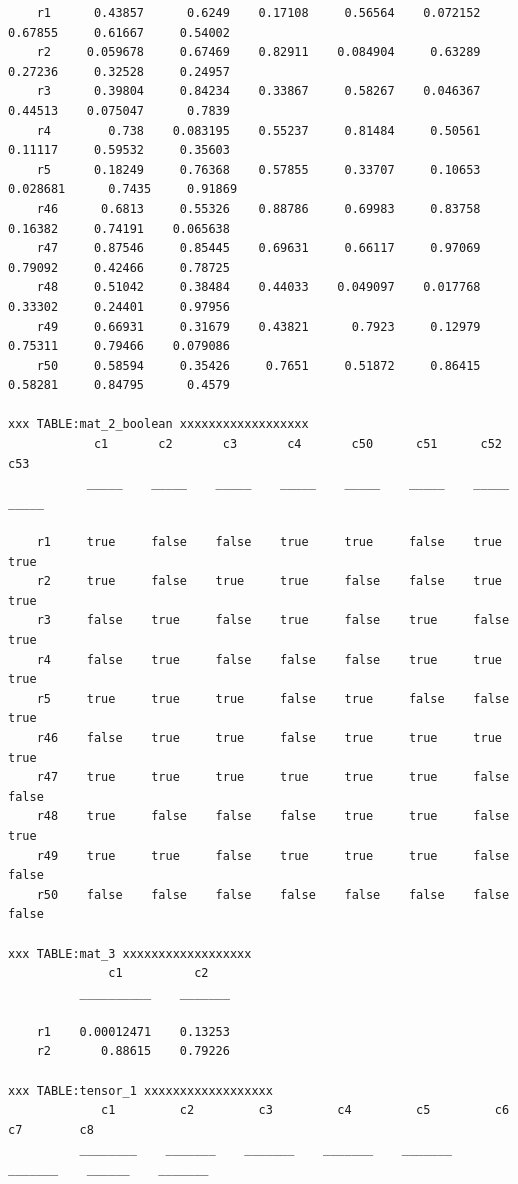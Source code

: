 \documentclass[
]{book}
\begin{document}
\begin{verbatim}
    r1      0.43857      0.6249    0.17108     0.56564    0.072152     0.67855     0.61667     0.54002
    r2     0.059678     0.67469    0.82911    0.084904     0.63289     0.27236     0.32528     0.24957
    r3      0.39804     0.84234    0.33867     0.58267    0.046367     0.44513    0.075047      0.7839
    r4        0.738    0.083195    0.55237     0.81484     0.50561     0.11117     0.59532     0.35603
    r5      0.18249     0.76368    0.57855     0.33707     0.10653    0.028681      0.7435     0.91869
    r46      0.6813     0.55326    0.88786     0.69983     0.83758     0.16382     0.74191    0.065638
    r47     0.87546     0.85445    0.69631     0.66117     0.97069     0.79092     0.42466     0.78725
    r48     0.51042     0.38484    0.44033    0.049097    0.017768     0.33302     0.24401     0.97956
    r49     0.66931     0.31679    0.43821      0.7923     0.12979     0.75311     0.79466    0.079086
    r50     0.58594     0.35426     0.7651     0.51872     0.86415     0.58281     0.84795      0.4579

xxx TABLE:mat_2_boolean xxxxxxxxxxxxxxxxxx
            c1       c2       c3       c4       c50      c51      c52      c53 
           _____    _____    _____    _____    _____    _____    _____    _____

    r1     true     false    false    true     true     false    true     true 
    r2     true     false    true     true     false    false    true     true 
    r3     false    true     false    true     false    true     false    true 
    r4     false    true     false    false    false    true     true     true 
    r5     true     true     true     false    true     false    false    true 
    r46    false    true     true     false    true     true     true     true 
    r47    true     true     true     true     true     true     false    false
    r48    true     false    false    false    true     true     false    true 
    r49    true     true     false    true     true     true     false    false
    r50    false    false    false    false    false    false    false    false

xxx TABLE:mat_3 xxxxxxxxxxxxxxxxxx
              c1          c2   
          __________    _______

    r1    0.00012471    0.13253
    r2       0.88615    0.79226

xxx TABLE:tensor_1 xxxxxxxxxxxxxxxxxx
             c1         c2         c3         c4         c5         c6         c7        c8   
          ________    _______    _______    _______    _______    _______    ______    _______


\end{verbatim}
\end{document}

